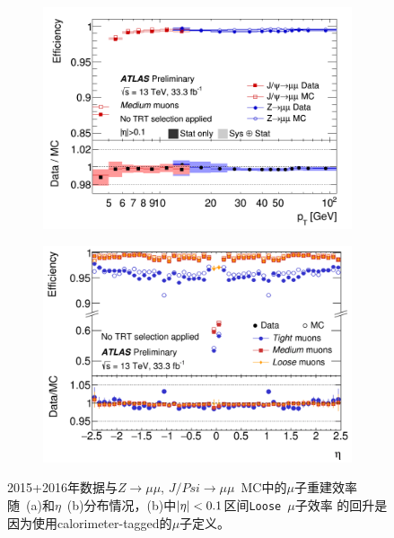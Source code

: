 \begin{figure}[h]
\begin{center}
\begin{subfigure}[b]{0.45\textwidth}
\centering
      \includegraphics[width=\textwidth]{fig/muon_reco_eff_pt.png}
     \caption{}
      \label{fig:muon_reco_eff_pt}
  \end{subfigure}
 \begin{subfigure}[b]{0.45\textwidth}
 \centering
      \includegraphics[width=\textwidth]{fig/muon_reco_eff_eta.png}
      \caption{}
      \label{fig:muon_reco_eff_eta}
  \end{subfigure}
\caption{2015+2016年数据与$Z\rightarrow \mu\mu$,  $J/Psi\rightarrow \mu\mu$~MC中的$\mu$子重建效率随\pT~(a)和$\eta$~(b)分布情况，(b)中$|\eta|<0.1$区间\texttt{Loose}~$\mu$子效率
的回升是因为使用calorimeter-tagged的$\mu$子定义。} 
 \label{fig:muon_reco_eff}
\end{center}
\end{figure}
